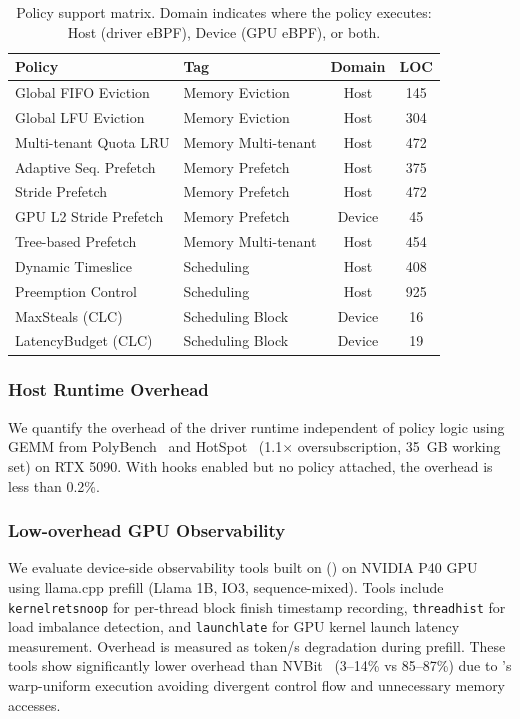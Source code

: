 \begin{table}[t]
\centering
\small

\begin{tabularx}{\columnwidth}{@{} X l c c @{}}
\toprule
\textbf{Policy} & \textbf{Tag} & \textbf{Domain} & \textbf{LOC} \\
\midrule
Global FIFO Eviction & Memory Eviction & Host & 145 \\
Global LFU Eviction & Memory Eviction & Host & 304 \\
Multi-tenant Quota LRU & Memory Multi-tenant & Host & 472 \\
Adaptive Seq. Prefetch & Memory Prefetch & Host & 375 \\
Stride Prefetch & Memory Prefetch & Host & 472 \\
GPU L2 Stride Prefetch & Memory Prefetch & Device & 45 \\
Tree-based Prefetch & Memory Multi-tenant & Host & 454 \\
Dynamic Timeslice & Scheduling & Host & 408 \\
Preemption Control & Scheduling & Host & 925 \\
MaxSteals (CLC) & Scheduling Block & Device & 16 \\
LatencyBudget (CLC) & Scheduling Block & Device & 19 \\
\bottomrule
\end{tabularx}
\caption{Policy support matrix. Domain indicates where the policy executes: Host (driver eBPF), Device (GPU eBPF), or both.}
\label{tab:support-matrix}
\end{table}

\subsubsection{Host Runtime Overhead}

We quantify the overhead of the \sys driver runtime independent of policy logic using GEMM from PolyBench~\cite{grauer2012auto} and HotSpot~\cite{che2009rodinia} (1.1$\times$ oversubscription, 35~GB working set) on RTX 5090. With hooks enabled but no policy attached, the overhead is less than 0.2\%. 

\subsubsection{Low-overhead GPU Observability}

We evaluate device-side observability tools built on \sys () on NVIDIA P40 GPU using llama.cpp prefill (Llama 1B, IO3, sequence-mixed). Tools include \texttt{kernelretsnoop} for per-thread block finish timestamp recording, \texttt{threadhist} for load imbalance detection, and \texttt{launchlate} for GPU kernel launch latency measurement. Overhead is measured as token/s degradation during prefill. These tools show significantly lower overhead than NVBit~\cite{villa2019nvbit} (3--14\% vs 85--87\%) due to \sys's warp-uniform execution avoiding divergent control flow and unnecessary memory accesses.

